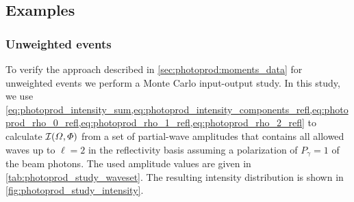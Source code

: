 \subsection{Examples}%
\label{sec:photoprod:example}

\subsubsection{Unweighted events}%
\label{sec:photoprod:example_unweighted}

To verify the approach described in \cref{sec:photoprod:moments_data}
for unweighted events we perform a Monte Carlo input-output study.  In
this study, we use
\cref{eq:photoprod_intensity_sum,eq:photoprod_intensity_components_refl,eq:photoprod_rho_0_refl,eq:photoprod_rho_1_refl,eq:photoprod_rho_2_refl}
to calculate $\mathcal{I}(\Omega, \Phi)$ from a set of partial-wave
amplitudes that contains all allowed waves up to $\ell = 2$ in the
reflectivity basis assuming a polarization of $P_\gamma = 1$ of the
beam photons.  The used amplitude values are given in
\cref{tab:photoprod_study_waveset}.  The resulting intensity
distribution is shown in \cref{fig:photoprod_study_intensity}.

